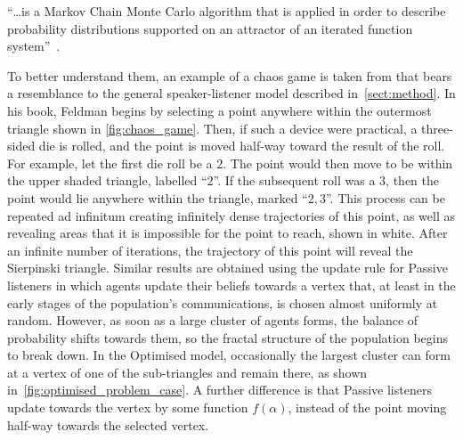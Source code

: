 \begin{displayquote} 
    ``\dots is a Markov Chain Monte Carlo algorithm that is applied in order to describe probability distributions supported on an attractor of an iterated function system''~\cite{Barnsley2011ChaosSpaces}.
\end{displayquote}

To better understand them, an example of a chaos game is taken from \cite{Feldman.DavidP2012ChaosIntroduction} that bears a resemblance to the general speaker-listener model described in~\cref{sect:method}. In his book, Feldman begins by selecting a point anywhere within the outermost triangle shown in \cref{fig:chaos_game}. Then, if such a device were practical, a three-sided die is rolled, and the point is moved half-way toward the result of the roll. For example, let the first die roll be a $2$. The point would then move to be within the upper shaded triangle, labelled ``$2$''. If the subsequent roll was a $3$, then the point would lie anywhere within the triangle, marked ``$2,3$''. This process can be repeated ad infinitum creating infinitely dense trajectories of this point, as well as revealing areas that it is impossible for the point to reach, shown in white. After an infinite number of iterations, the trajectory of this point will reveal the Sierpinski triangle. Similar results are obtained using the update rule for Passive listeners in which agents update their beliefs towards a vertex that, at least in the early stages of the population's communications, is chosen almost uniformly at random. However, as soon as a large cluster of agents forms, the balance of probability shifts towards them, so the fractal structure of the population begins to break down. In the Optimised model, occasionally the largest cluster can form at a vertex of one of the sub-triangles and remain there, as shown in~\cref{fig:optimised_problem_case}. A further difference is that Passive listeners update towards the vertex by some function $f(\alpha)$, instead of the point moving half-way towards the selected vertex.  

